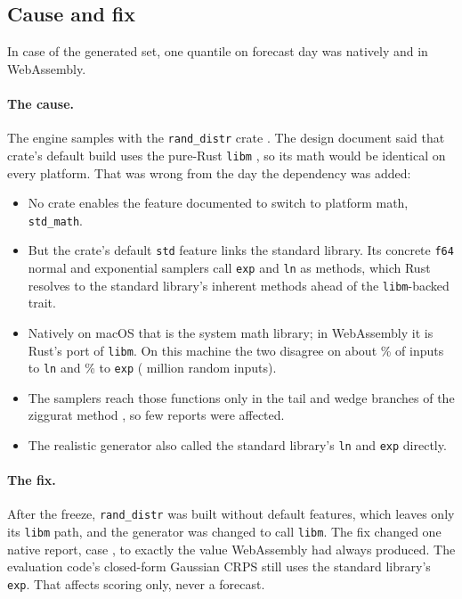 \begin{table}[htbp]
\centering\footnotesize
{}
\caption{Bit identity on one arm64 Mac, for the frozen engine and after the
post-freeze fix. The native debug build wrote the manifest, so its row
agrees by construction; every other leg is checked against it.}
\label{tab:identity}
\end{table}

\subsection{Cause and fix}
\label{app:identity}
In case  of the generated set, one quantile on forecast day
 was \texttt{} natively and
\texttt{} in WebAssembly.

\paragraph{The cause.} The engine samples with the \texttt{rand\_distr}
crate \citep{rand_distr_crate}. The design document said that crate's
default build uses the pure-Rust \texttt{libm} \citep{libm_crate}, so its
math would be identical on every platform. That was wrong from the day the
dependency was added:
\begin{itemize}
\item No crate enables the feature documented to switch to platform
  math, \texttt{std\_math}.
\item But the crate's default \texttt{std} feature links the standard
  library. Its concrete \texttt{f64} normal and exponential samplers call
  \texttt{exp} and \texttt{ln} as methods, which Rust resolves to the
  standard library's inherent methods ahead of the \texttt{libm}-backed
  trait.
\item Natively on macOS that is the system math library; in WebAssembly
  it is Rust's port of \texttt{libm}. On this machine the two disagree on
  about \% of inputs to \texttt{ln} and
  \% to \texttt{exp} ( million random
  inputs).
\item The samplers reach those functions only in the tail and wedge
  branches of the ziggurat method \citep{marsaglia2000ziggurat}, so few
  reports were affected.
\item The realistic generator also called the standard library's
  \texttt{ln} and \texttt{exp} directly.
\end{itemize}

\paragraph{The fix.} After the freeze, \texttt{rand\_distr} was built
without default features, which leaves only its \texttt{libm} path, and the
generator was changed to call \texttt{libm}. The fix changed one native
report, case , to exactly the value WebAssembly had always
produced. The evaluation code's closed-form Gaussian CRPS still uses the
standard library's \texttt{exp}. That affects scoring only, never a
forecast.


